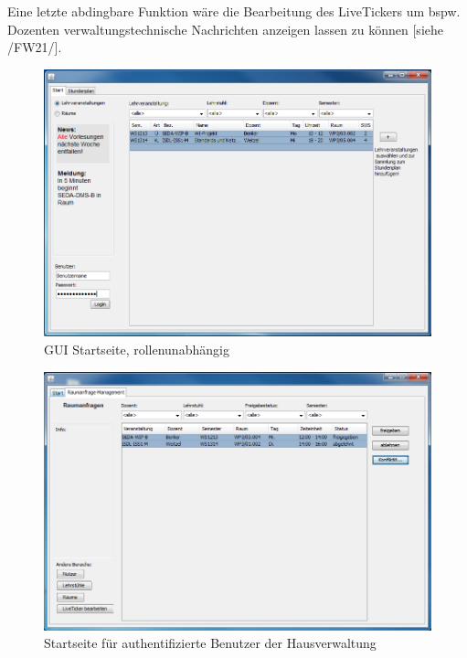Eine letzte abdingbare Funktion wäre die Bearbeitung des LiveTickers um bspw. Dozenten verwaltungstechnische Nachrichten anzeigen lassen zu können [siehe /FW21/].
\begin{figure}[H]
\begin{center}
\includegraphics[width=150mm]{images/section_7/HauptseiteAlle.PNG}
\caption{GUI Startseite, rollenunabhängig}
\label{img:hauptseite}
\end{center}
\end{figure}


\begin{figure}[H]
\begin{center}
\includegraphics[width=150mm]{images/section_7/VerwaltungHauptseite.PNG}
\caption{Startseite für authentifizierte Benutzer der Hausverwaltung}
\label{img:hauptseiteVerwaltung}
\end{center}
\end{figure}

